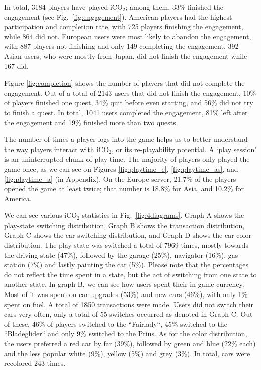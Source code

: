 \documentclass[preprint,authoryear,12pt]{elsarticle}
\begin{document}
In total, 3184 players have played iCO$_2$; among them, 33\% finished the engagement (see Fig.~\ref{fig:engagement}). American players had the highest participation and completion rate, with 725 players finishing the engagement, while 864 did not. European users were most likely to abandon the engagement, with 887 players not finishing and only 149 completing the engagement. 392 Asian users, who were mostly from Japan, did not finish the engagement while 167 did.

Figure \ref{fig:completion} shows the number of players that did not complete the engagement. Out of a total of 2143 users that did not finish the engagement, 10\% of players finished one quest, 34\% quit before even starting, and 56\% did not try to finish a quest. In total, 1041 users completed the engagement, 81\% left after the engagement and 19\% finished more than two quests.


The number of times a player logs into the game helps us to better understand the way players interact with iCO$_2$, or its re-playability potential. A `play session' is an uninterrupted chunk of play time. The majority of players only played the game once, as we can see on Figures \ref{fig:playtime_e}, \ref{fig:playtime_as}, and \ref{fig:playtime_a} (in Appendix).
On the Europe server, 21.7\% of the players opened the game at least twice; that number is 18.8\% for Asia, and 10.2\% for America.

We can see various iCO$_2$ statistics in Fig.~\ref{fig:4diagrams}. Graph A shows the play-state switching distribution, Graph B shows the transaction distribution, Graph C shows the car switching distribution, and Graph D shows the car color distribution. The play-state was switched a total of 7969 times, mostly towards the driving state (47\%), followed by the garage (25\%), navigator (16\%), gas station (7\%) and lastly painting the car (5\%). Please note that the percentages do not reflect the time spent in a state, but the act of switching from one state to another state. In graph B, we can see how users spent their in-game currency. Most of it was spent on car upgrades (53\%) and new cars (46\%), with only 1\% spent on fuel. A total of 1850 transactions were made. Users did not switch their cars very often, only a total of 55 switches occurred as denoted in Graph C. Out of these, 46\% of players switched to the ``Fairlady``, 45\% switched to the ``Bladeglider`` and only 9\% switched to the Prius. As for the color distribution, the users preferred a red car by far (39\%), followed by green and blue (22\% each) and the less popular white (9\%), yellow (5\%) and grey (3\%). In total, cars were recolored 243 times.
\end{document}
